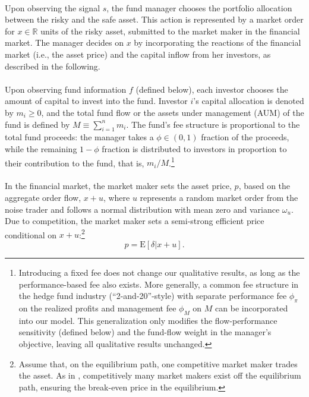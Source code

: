 \paragraph{}
Upon observing the signal $s$, the fund manager chooses the portfolio allocation between the risky and the safe asset. This action is represented by a market order for $x\in \mathbb{R}$ units of the risky asset, submitted to the market maker in the financial market. The manager decides on $x$ by incorporating the reactions of the financial market (i.e., the asset price) and the capital inflow from her investors, as described in the following.

\paragraph{}
Upon observing fund information $f$ (defined below), each investor chooses the amount of capital to invest into the fund. Investor $i$'s capital allocation is denoted by $m_i \ge 0$, and the total fund flow or the assets under management (AUM) of the fund is defined by $M \equiv \sum_{i=1}^{n}m_{i}$. The fund’s fee structure is proportional to the total fund proceeds: the manager takes a $\phi\in(0,1)$ fraction of the proceeds, while the remaining $1-\phi$ fraction is distributed to investors in proportion to their contribution to the fund, that is, $m_i / M$.\footnote{Introducing a fixed fee does not change our qualitative results, as long as the performance-based fee also exists. More generally, a common fee structure in the hedge fund industry (``2-and-20''-style) with separate performance fee $\phi_{\pi}$ on the realized profits and management fee $\phi_{M}$ on $M$ can be incorporated into our model. This generalization only modifies the flow-performance sensitivity (defined below) and the fund-flow weight in the manager's objective, leaving all qualitative results unchanged.}

\paragraph{}
In the financial market, the market maker sets the asset price, $p$, based on the aggregate order flow, $x+u$, where $u$ represents a random market order from the noise trader and follows a normal distribution with mean zero and variance $\omega_u$. Due to competition, the market maker sets a semi-strong efficient price conditional on $x+u$:\footnote{Assume that, on the equilibrium path, one competitive market maker trades the asset. As in \citet{kyle1985continuous}, competitively many market makers exist off the equilibrium path, ensuring the break-even price in the equilibrium.} 
\begin{equation}
p=\mathrm{E}[\delta|x+u].\label{p}
\end{equation}


